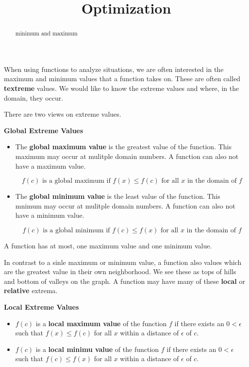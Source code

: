 \documentclass{ximera}
\title{Optimization}
\begin{document}
\begin{abstract}
minimum and maximum
\end{abstract}
\maketitle



When using functions to analyze situations, we are often interested in the maximum and minimum values that a function takes on. These are often called \textbf{textreme} values. We would like to know the extreme values and where, in the domain, they occur.



There are two views on extreme values.

\textbf{Global Extreme Values} 

\begin{itemize}
\item The \textbf{global maximum value} is the greatest value of the function.  This maximum may occur at mulitple domain numbers.  A function can also not have a maximum value.

\[  f(c) \text{ is a global maximum if } f(x) \leq f(c) \text{ for all } x \text{ in the domain of } f \]

\item The \textbf{global minimum value} is the least value of the function.  This mnimum may occur at mulitple domain numbers.  A function can also not have a minimum value.

\[  f(c) \text{ is a global minimum if } f(c) \leq f(x) \text{ for all } x \text{ in the domain of } f \]
\end{itemize}

A function has at most, one maximum value and one minimum value.

In contrast to a sinle maximum or minimum value, a function also values which are the greatest value in their own neighborhood.  We see these as tops of hills and bottom of valleys on the graph.  A function may have many of these \textbf{local} or \textbf{relative} extrema.







\textbf{Local Extreme Values} \\
\begin{itemize}
\item $f(c)$ is a \textbf{local maximum value} of the function $f$ if there exists an $0 < \epsilon$ such that $f(x) \leq f(c)$ for all $x$ within a distance of $\epsilon$ of $c$.

\item $f(c)$ is a \textbf{local minimu value} of the function $f$ if there exists an $0 < \epsilon$ such that $f(c) \leq f(x)$ for all $x$ within a distance of $\epsilon$ of $c$.
\end{itemize}
\end{document}
